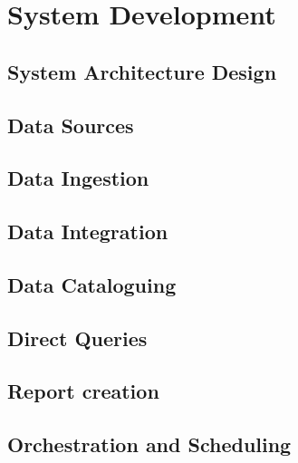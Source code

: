 \chapter{System Development}
\label{chp:project}

\section{System Architecture Design}

\section{Data Sources}

\section{Data Ingestion}

\section{Data Integration}

\section{Data Cataloguing}

\section{Direct Queries}

\section{Report creation}

\section{Orchestration and Scheduling}